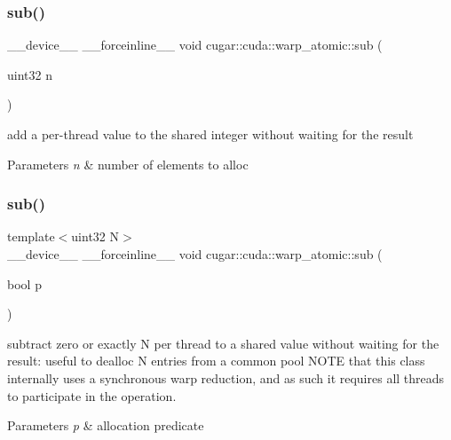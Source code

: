 \subsubsection{\texorpdfstring{sub()}{sub()}\hspace{0.1cm}{\footnotesize\ttfamily [1/6]}}
{\footnotesize\ttfamily \+\_\+\+\_\+device\+\_\+\+\_\+ \+\_\+\+\_\+forceinline\+\_\+\+\_\+ void cugar\+::cuda\+::warp\+\_\+atomic\+::sub (\begin{DoxyParamCaption}\item[{uint32}]{n }\end{DoxyParamCaption})\hspace{0.3cm}{\ttfamily [inline]}}

add a per-\/thread value to the shared integer without waiting for the result


\begin{DoxyParams}{Parameters}
{\em n} & number of elements to alloc \\
\hline
\end{DoxyParams}
\mbox{\label{structcugar_1_1cuda_1_1warp__atomic_afc825f3d2bf3d09ff343a4397ea1d737}} 
\subsubsection{\texorpdfstring{sub()}{sub()}\hspace{0.1cm}{\footnotesize\ttfamily [2/6]}}
{\footnotesize\ttfamily template$<$uint32 N$>$ \\
\+\_\+\+\_\+device\+\_\+\+\_\+ \+\_\+\+\_\+forceinline\+\_\+\+\_\+ void cugar\+::cuda\+::warp\+\_\+atomic\+::sub (\begin{DoxyParamCaption}\item[{bool}]{p }\end{DoxyParamCaption})\hspace{0.3cm}{\ttfamily [inline]}}

subtract zero or exactly N per thread to a shared value without waiting for the result\+: useful to dealloc N entries from a common pool N\+O\+TE that this class internally uses a synchronous warp reduction, and as such it requires all threads to participate in the operation.


\begin{DoxyParams}{Parameters}
{\em p} & allocation predicate \\
\hline
\end{DoxyParams}
\mbox{\label{structcugar_1_1cuda_1_1warp__atomic_a2ad91303e179d17d88aa75f1f0d46602}} 

